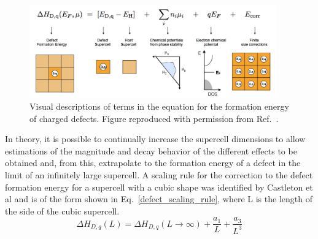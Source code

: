 \documentclass[11pt, twoside]{report}
\begin{document}
\begin{figure}[h!]
  \centering
    \includegraphics[width=0.95\textwidth]{figures/pylada_eq.png}
    \caption[Visual descriptions of terms in the equation for the formation energy of charged defects.]{Visual descriptions of terms in the equation for the formation energy of charged defects. Figure reproduced with permission from Ref.~.}
  \label{pylada_eq}
\end{figure}

In theory, it is possible to continually increase the supercell dimensions to allow estimations of the magnitude and decay behavior of the different effects to be obtained and, from this, extrapolate to the formation energy of a defect in the limit of an infinitely large supercell. A scaling rule for the correction to the defect formation energy for a supercell with a cubic shape was identified by Castleton et al \cite{supercell_scaling} and is of the form shown in Eq.~\ref{defect_scaling_rule}, where L is the length of the side of the cubic supercell.
\begin{equation}\label{defect_scaling_rule}
\Delta H_{D,q}(L) = \Delta H_{D,q}(L \rightarrow \infty) + \frac{a_1}{L} + \frac{a_3}{L^3}
\end{equation}
\end{document}
